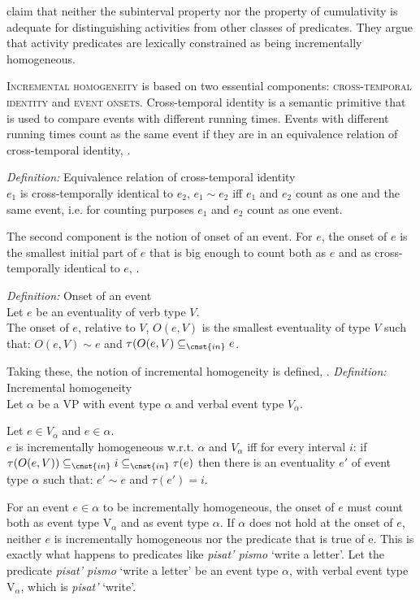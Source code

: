 \documentclass[output=paper,
]{langscibook}
\begin{document}
\citet{landman2010incremental,landman2012felicity} claim that neither the subinterval property nor the property of cumulativity is adequate for distinguishing activities from other classes of predicates. They argue that activity predicates are lexically constrained as being incrementally homogeneous.

\textsc{Incremental homogeneity} is based on two essential components: \textsc{cross-temporal identity} and \textsc{event onsets}. Cross-temporal identity is a semantic primitive that is used to compare events with different running times. Events with different running times count as the same event if they are in an equivalence relation of cross-temporal identity, .

\eanoraggedright \label{es28}
\textit{Definition:} Equivalence relation of cross-temporal identity\smallskip\\
$e_1$ is cross-temporally identical to $e_2$, $e_1 \sim e_2$ iff $e_1$ and $e_2$ count as one and the same event, i.e. for counting purposes $e_1$ and $e_2$ count as one event.
\z

\noindent The second component is the notion of onset of an event. For $e$, the onset of $e$ is the smallest initial part of $e$ that is big enough to count both as $e$ and as cross-temporally identical to $e$, .

\ea \label{ex:naumov:29}
\textit{Definition:} Onset of an event\smallskip\\
Let $e$ be an eventuality of verb type $V$. \\
The onset of $e$, relative to $V$, $O(e,V)$ is the smallest eventuality of type $V$ such that: $O(e,V) \sim e$ and $\tau(O(e,V) \subseteq_{\cnst{in}} e$.
\z

\noindent Taking these, the notion of incremental homogeneity is defined, .
\ea \label{ex:naumov:30}
\textit{Definition:} Incremental homogeneity\smallskip\\
Let $\alpha$ be a VP with event type $\alpha$ and verbal event type $V_\alpha$.

Let $e\in V_\alpha$ and $e \in \alpha$. \\
$e$ is incrementally homogeneous w.r.t. $\alpha$ and $V_\alpha$ iff for every interval $i$: if $\tau(O(e,V)) \subseteq_{\cnst{in}} i \subseteq_{\cnst{in}} \tau(e)$ then there is an eventuality $e'$ of event type $\alpha$ such that: $e' \sim e$ and $\tau(e') = i$.
\z

\noindent For an event $e \in \alpha$ to be incrementally homogeneous, the onset of $e$ must count both as event type V$_\alpha$ and as event type $\alpha$. If $\alpha$ does not hold at the onset of $e$, neither $e$ is incrementally homogeneous nor the predicate that is true of e. This is exactly what happens to predicates like \textit{pisat’ pismo} `write a letter’. Let the predicate \textit{pisat’ pismo} `write a letter’ be an event type $\alpha$, with verbal event type V$_\alpha$, which is \textit{pisat’} `write’.
\end{document}
